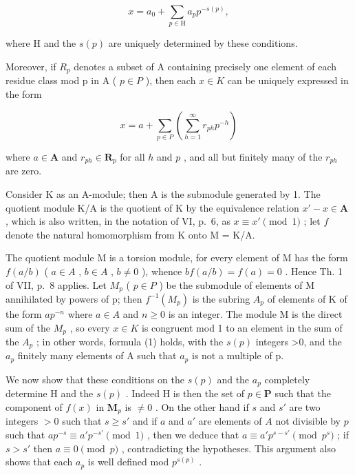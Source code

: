 \[
x = a _ {0} + \sum_ {p \in \mathrm{H}} a _ {p} p ^ {- s (p)},\tag{1}
\]

where H and the \(s(p)\) are uniquely determined by these conditions.

Moreover, if \(R_{p}\) denotes a subset of A containing precisely one element of each residue class mod p in A ( \(p \in P\) ), then each \(x \in K\) can be uniquely expressed in the form

\[
x = a + \sum_ {p \in P} \left(\sum_ {h = 1} ^ {\infty} r _ {p h} p ^ {- h}\right)\tag{2}
\]

where \(a \in \mathbf{A}\) and \(r_{ph} \in \mathbf{R}_p\) for all \(h\) and \(p\) , and all but finitely many of the \(r_{ph}\) are zero.

Consider K as an A-module; then A is the submodule generated by 1. The quotient module K/A is the quotient of K by the equivalence relation \(x' - x \in \mathbf{A}\) , which is also written, in the notation of VI, p.~6, as \(x \equiv x' \pmod{1}\) ; let \(f\) denote the natural homomorphism from K onto M = K/A.

The quotient module M is a torsion module, for every element of M has the form \(f(a/b)\) ( \(a \in A\) , \(b \in A\) , \(b \neq 0\) ), whence \(bf(a/b) = f(a) = 0\) . Hence Th. 1 of VII, p.~8 applies. Let \(M_{p}\) ( \(p \in P\) ) be the submodule of elements of M annihilated by powers of p; then \(f^{-1}(M_{p})\) is the subring \(A_{p}\) of elements of K of the form \(ap^{-n}\) where \(a \in A\) and \(n \geqslant 0\) is an integer. The module M is the direct sum of the \(M_{p}\) , so every \(x \in K\) is congruent mod 1 to an element in the sum of the \(A_{p}\) ; in other words, formula (1) holds, with the \(s(p)\) integers \textgreater0, and the \(a_{p}\) finitely many elements of A such that \(a_{p}\) is not a multiple of p.

We now show that these conditions on the \(s(p)\) and the \(a_{p}\) completely determine H and the \(s(p)\) . Indeed H is then the set of \(p \in \mathbf{P}\) such that the component of \(f(x)\) in \(\mathbf{M}_{p}\) is \(\neq 0\) . On the other hand if \(s\) and \(s'\) are two integers \(>0\) such that \(s \geqslant s'\) and if \(a\) and \(a'\) are elements of \(A\) not divisible by \(p\) such that \(ap^{-s} \equiv a'p^{-s'} \pmod{1}\) , then we deduce that \(a \equiv a'p^{s - s'} \pmod{p^s}\) ; if \(s > s'\) then \(a \equiv 0 \pmod{p}\) , contradicting the hypotheses. This argument also shows that each \(a_p\) is well defined mod \(p^{s(p)}\) .


